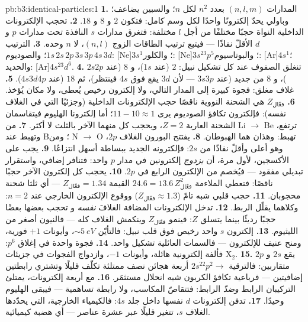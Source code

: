 \begin{solution}{pb:b3:identical-particles:1}
\textbf{1.} المدارات $(n, l, m)$ بعدد $n^2$ لكل $n$؛ والسبين يضاعف؛
وباولي يحدّ إلكترونًا واحدًا لكل وسم كامل: فتكون $2$ و $8$ و $18$.
\textbf{2.} تحجب الإلكترونات الداخلية النواة حجبًا مختلفًا من أجل
$l$ مختلفة: فتغرق مدارات $s$ النافذة تحت مدارات $p$ و $d$
الأقلّ نفاذًا --- فيتبع ترتيب الطاقات الزوج $(n, l)$، لا $n$
وحده.
\textbf{3.} الترتيب $1s\,2s\,2p\,3s\,3p\,4s\,3d$؛ والصوديوم: [Ne]$3s^1$؛
والكلور: [Ne]$3s^23p^5$؛ والبوتاسيوم: [Ar]$4s^1$؛ والحديد: [Ar]$4s^23d^6$.
\textbf{4.} تنغلق الصفوف عند كل تشكيل نبيل: $2$ (عند $1s$)،
و $8$ (عند $2s2p$)، و $8$ من جديد (عند $3s3p$ --- لأن $3d$ يقع فوق $4s$
فينتظر)، ثم $18$ (عند $4s3d4p$).
\textbf{5.} غلاف مغلق: فجوة كبيرة إلى المدار التالي، ولا
إلكترون رخيص يُعطى، ولا مكان يُؤخذ.
\textbf{6.} $Z_{\text{فعّال}}$ هي الشحنة النووية ناقصًا
حجب الإلكترونات الداخلية (وجزئيًا التي في الغلاف نفسه): فإلكترون
تكافؤ الصوديوم يرى $11 - 10 \approx 1$؛ أما إلكترونا الهليوم فيتقاسمان
الشحنة العارية $Z = 2$، ويحجب كل منهما الآخر بالثلث لا أكثر.
\textbf{7.} من Li $\to$ Be ترتفع، وتهبط عند B؛ ومن N $\to$ O تهبط:
وهذان هما الهبوطان.
\textbf{8.} يفتتح البورون الغلاف $2p$، وهو أعلى وأقلّ نفاذًا من
$2s$: فإلكترونه الجديد ببساطة أسهل انتزاعًا.
\textbf{9.} يجب على الأكسجين، لأول مرة، أن \emph{يزدوج} إلكترونين
في مدار $p$ واحد: فتنافر إضافي، واستقرار تبديلي مفقود
--- فيُخصم من الإلكترون الرابع في $2p$.
\textbf{10.} يحجب كل إلكترون الآخر حجبًا ناقصًا:
فتعطي الملاءمة $24.6 = 13.6\,Z_{\text{فعّال}}^2$ القيمة $Z_{\text{فعّال}} =
1.34$ --- أي ثلثا شحنة محجوبان.
\textbf{11.} حجب قلبي شبه تامّ ($Z_{\text{فعّال}}
\approx 1.3$) ووقوع الإلكترون الخارجي عند $n = 2$: وكلاهما يقلّل
الربط.
\textbf{12.} تدخل الإلكترونات المضافة الغلافَ \emph{نفسه} و
تحجب بعضها بعضًا حجبًا رديئًا بينما يتسلق $Z$: فينمو $Z_{\text{فعّال}}$
وينكمش الغلاف كله --- فالنيون أصغر من الليثيوم.
\textbf{13.} إلكترون $s$ واحد رخيص فوق قلب نبيل: فالتأيّن
$\sim\qty{5}{eV}$، وأيونات $+1$ فورية، ومنح عنيف للإلكترون
--- فالسمات العائلية تشكيل واحد.
\textbf{14.} فجوة واحدة في إغلاق $p^6$: فألفة إلكترونية
هائلة، وأيونات $-1$، وازدواج الفجوات في جزيئات X$_2$.
\textbf{15.} يقع $2s$ و $2p$ متقاربين: فالترقية $2s^22p^2 \to$
أربعة هجائن نصف ممتلئة تكلّف قليلًا وتشتري رابطتين إضافيتين ---
فرباعية تكافؤ الكربون شبه انحلال مستثمَر.
\textbf{16.} مع أربعة إلكترونات، يمتلئ التركيبان الرابط
\emph{وضدّ} الرابط: فتتقاصّ المكاسب، ولا رابطة تساهمية
--- فيبقى الهليوم وحيدًا.
\textbf{17.} تدفن إلكترونات $d$ نفسها داخل جلد $4s$:
فالكيمياء الخارجية، التي يحدّدها الغلاف $s$، تتغير قليلًا عبر
عشرة عناصر --- أي هضبة كيميائية.

\end{solution}
